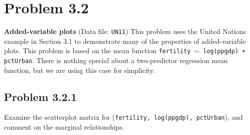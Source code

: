 \documentclass[12pt,oneside,a4paper]{article}\usepackage[]{graphicx}\usepackage[]{xcolor}
\title{\hmwkTitle}
\author{\hmwkAuthorName}
\date{\today}
\newcommand{\problem}[1]
{
    \clearpage
    \section*{Problem {#1}}
}
\newcommand{\subproblem}[1]
{
    \subsection*{Problem {#1}}
}
\begin{document}
\maketitle



\problem{3.2}
\textbf{Added-variable plots} (Data file: \texttt{UN11}) This problem uses the United Nations example in Section 3.1 to demonstrate many of the properties of added-variable plots. This problem is based on the mean function \texttt{fertility $\sim$ log(ppgdp) + pctUrban}. There is nothing special about a two-predictor regression mean function, but we are using this case for simplicity.

\subproblem{3.2.1}
Examine the scatterplot matrix for (\texttt{fertility, log(ppgdp), pctUrban}), and comment on the marginal relationships.
\end{document}

